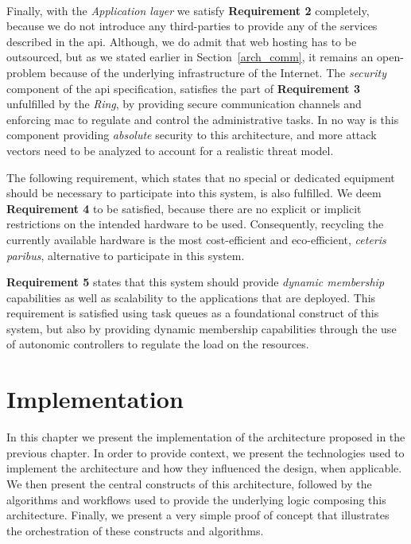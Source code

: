 \documentclass[12pt, titlepage]{uo_temp}
\begin{document}
     \\ Finally, with the \emph{Application layer} we satisfy \textbf{Requirement 2}
     completely, because we do not introduce any third-parties to provide any of the
     services described in the \gls{api}. Although, we do admit that web hosting has to be
     outsourced, but as we stated earlier in Section~\ref{arch_comm}, it remains an
     open-problem because of the underlying infrastructure of the Internet. The
     \emph{security} component of the \gls{api} specification, satisfies the part of
     \textbf{Requirement 3} unfulfilled by the \emph{Ring}, by providing secure
     communication channels and enforcing \gls{mac} to regulate and control the
     administrative tasks. In no way is this component providing \emph{absolute} security
     to this architecture, and more attack vectors need to be analyzed to account for a
     realistic threat model.

     The following requirement, which states that no special or dedicated equipment should
     be necessary to participate into this system, is also fulfilled. We deem
     \textbf{Requirement 4} to be satisfied, because there are no explicit or implicit
     restrictions on the intended hardware to be used. Consequently, recycling the
     currently available hardware is the most cost-efficient and eco-efficient,
     \emph{ceteris paribus}, alternative to participate in this system.

     \textbf{Requirement 5} states that this system should provide \emph{dynamic
       membership} capabilities as well as scalability to the applications that are
     deployed. This requirement is satisfied using task queues as a foundational construct
     of this system, but also by providing dynamic membership capabilities through the use
     of autonomic controllers to regulate the load on the resources.

     \chapter{Implementation}\label{implementation_chap}
     In this chapter we present the implementation of the architecture proposed in the
     previous chapter. In order to provide context, we present the technologies used to
     implement the architecture and how they influenced the design, when applicable. We
     then present the central constructs of this architecture, followed by the algorithms
     and workflows used to provide the underlying logic composing this
     architecture. Finally, we present a very simple proof of concept that illustrates the
     orchestration of these constructs and algorithms. 
\end{document}

